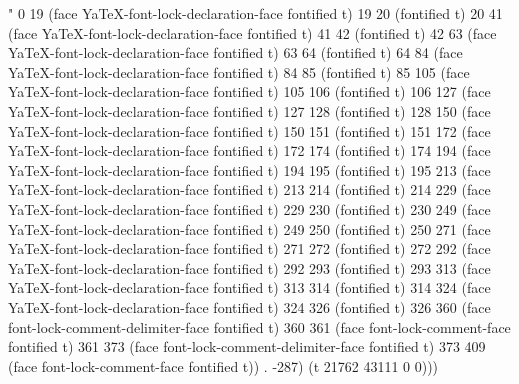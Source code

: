" 0 19 (face YaTeX-font-lock-declaration-face fontified t) 19 20 (fontified t) 20 41 (face YaTeX-font-lock-declaration-face fontified t) 41 42 (fontified t) 42 63 (face YaTeX-font-lock-declaration-face fontified t) 63 64 (fontified t) 64 84 (face YaTeX-font-lock-declaration-face fontified t) 84 85 (fontified t) 85 105 (face YaTeX-font-lock-declaration-face fontified t) 105 106 (fontified t) 106 127 (face YaTeX-font-lock-declaration-face fontified t) 127 128 (fontified t) 128 150 (face YaTeX-font-lock-declaration-face fontified t) 150 151 (fontified t) 151 172 (face YaTeX-font-lock-declaration-face fontified t) 172 174 (fontified t) 174 194 (face YaTeX-font-lock-declaration-face fontified t) 194 195 (fontified t) 195 213 (face YaTeX-font-lock-declaration-face fontified t) 213 214 (fontified t) 214 229 (face YaTeX-font-lock-declaration-face fontified t) 229 230 (fontified t) 230 249 (face YaTeX-font-lock-declaration-face fontified t) 249 250 (fontified t) 250 271 (face YaTeX-font-lock-declaration-face fontified t) 271 272 (fontified t) 272 292 (face YaTeX-font-lock-declaration-face fontified t) 292 293 (fontified t) 293 313 (face YaTeX-font-lock-declaration-face fontified t) 313 314 (fontified t) 314 324 (face YaTeX-font-lock-declaration-face fontified t) 324 326 (fontified t) 326 360 (face font-lock-comment-delimiter-face fontified t) 360 361 (face font-lock-comment-face fontified t) 361 373 (face font-lock-comment-delimiter-face fontified t) 373 409 (face font-lock-comment-face fontified t)) . -287) (t 21762 43111 0 0)))
